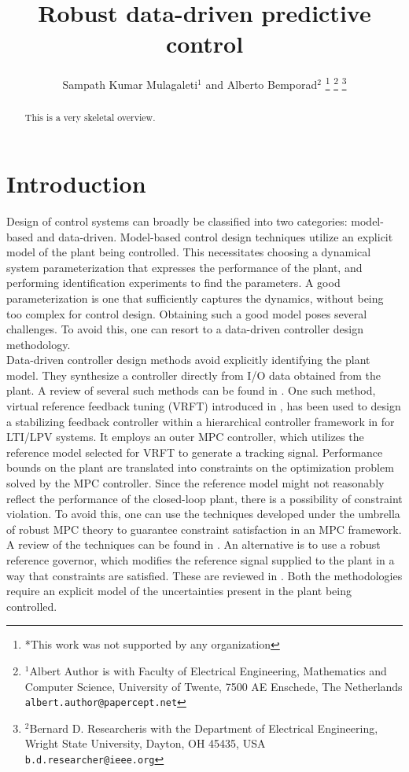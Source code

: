 \documentclass[letterpaper, 10 pt, conference]{ieeeconf}  %
\title{\LARGE \bf
Robust data-driven predictive control
}
\author{Sampath Kumar Mulagaleti$^{1}$ and Alberto Bemporad$^{2}$%
\thanks{*This work was not supported by any organization}%
\thanks{$^{1}$Albert Author is with Faculty of Electrical Engineering, Mathematics and Computer Science,
        University of Twente, 7500 AE Enschede, The Netherlands
        {\tt\small albert.author@papercept.net}}%
\thanks{$^{2}$Bernard D. Researcheris with the Department of Electrical Engineering, Wright State University,
        Dayton, OH 45435, USA
        {\tt\small b.d.researcher@ieee.org}}%
}
\begin{document}
\maketitle
\thispagestyle{empty}
\pagestyle{empty}


\begin{abstract}

This is a very skeletal overview.

\end{abstract}


\section{Introduction}
Design of control systems can broadly be classified into two categories: model-based and data-driven. Model-based control design techniques utilize an explicit model of the plant being controlled. This necessitates choosing a dynamical system parameterization that  expresses the performance of the plant, and performing identification experiments to find the parameters. A good parameterization is one that sufficiently captures the dynamics, without being too complex for control design. Obtaining such a good model poses several challenges. To avoid this, one can resort to a data-driven controller design methodology. \\
\indent
Data-driven controller design methods avoid explicitly identifying the plant model. They synthesize a controller directly from I/O data obtained from the plant. A review of several such methods can be found in \cite{HOU20133}. One such method, virtual reference feedback tuning (VRFT) introduced in \cite{CAMPI20021337}, has been used to design a stabilizing feedback controller within a hierarchical controller framework in \cite{7932940} for LTI/LPV systems. It employs an outer MPC controller, which utilizes the reference model selected for VRFT to generate a tracking signal. Performance bounds on the plant are translated into constraints on the optimization problem solved by the MPC controller. Since the reference model might not reasonably reflect the performance of the closed-loop plant, there is a possibility of constraint violation.
To avoid this, one can use the techniques developed under the umbrella of robust MPC theory to guarantee constraint satisfaction in an MPC framework. A review of the techniques can be found in \cite{10.1007/BFb0109870}. An alternative is to use a robust reference governor, which modifies the reference signal supplied to the plant in a way that constraints are satisfied. These are reviewed in \cite{GARONE2017306}. Both the methodologies require an explicit model of the uncertainties present in the plant being controlled. 
\end{document}
